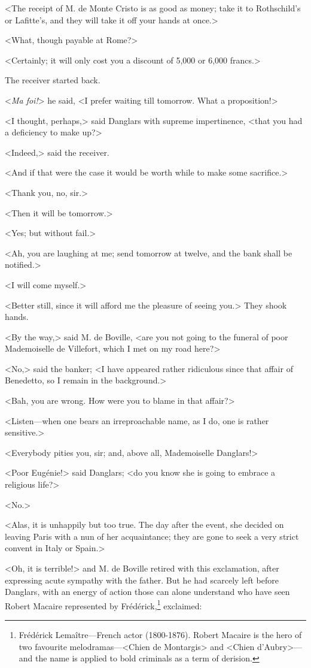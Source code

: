  <The receipt of M. de Monte Cristo is as good as money; take it to Rothschild's or Lafitte's, and they will take it off your hands at once.> 

 <What, though payable at Rome?> 

 <Certainly; it will only cost you a discount of 5,000 or 6,000 francs.> 

 The receiver started back. 

 <\textit{Ma foi!}> he said, <I prefer waiting till tomorrow. What a proposition!> 

 <I thought, perhaps,> said Danglars with supreme impertinence, <that you had a deficiency to make up?> 

 <Indeed,> said the receiver. 

 <And if that were the case it would be worth while to make some sacrifice.> 

 <Thank you, no, sir.> 

 <Then it will be tomorrow.> 

 <Yes; but without fail.> 

 <Ah, you are laughing at me; send tomorrow at twelve, and the bank shall be notified.> 

 <I will come myself.> 

 <Better still, since it will afford me the pleasure of seeing you.> They shook hands. 

 <By the way,> said M. de Boville, <are you not going to the funeral of poor Mademoiselle de Villefort, which I met on my road here?> 

 <No,> said the banker; <I have appeared rather ridiculous since that affair of Benedetto, so I remain in the background.> 

 <Bah, you are wrong. How were you to blame in that affair?> 

 <Listen—when one bears an irreproachable name, as I do, one is rather sensitive.> 

 <Everybody pities you, sir; and, above all, Mademoiselle Danglars!> 

 <Poor Eugénie!> said Danglars; <do you know she is going to embrace a religious life?> 

 <No.> 

 <Alas, it is unhappily but too true. The day after the event, she decided on leaving Paris with a nun of her acquaintance; they are gone to seek a very strict convent in Italy or Spain.> 

 <Oh, it is terrible!> and M. de Boville retired with this exclamation, after expressing acute sympathy with the father. But he had scarcely left before Danglars, with an energy of action those can alone understand who have seen Robert Macaire represented by Frédérick,\footnote{Frédérick Lemaître—French actor (1800-1876). Robert Macaire is the hero of two favourite melodramas—<Chien de Montargis> and <Chien d'Aubry>—and the name is applied to bold criminals as a term of derision.} exclaimed: 

